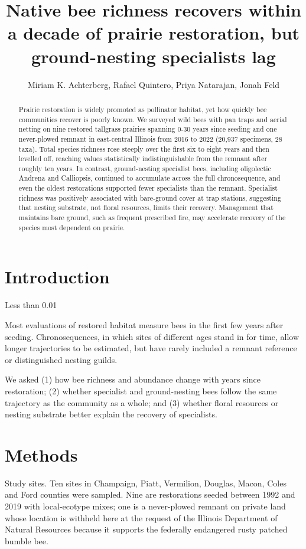 \documentclass{article}
\title{Native bee richness recovers within a decade of prairie restoration, but ground-nesting specialists lag}
\author{Miriam K. Achterberg, Rafael Quintero, Priya Natarajan, Jonah Feld}
\begin{document}
\maketitle
\begin{abstract}Prairie restoration is widely promoted as pollinator habitat, yet how quickly bee communities recover is poorly known. We surveyed wild bees with pan traps and aerial netting on nine restored tallgrass prairies spanning 0-30 years since seeding and one never-plowed remnant in east-central Illinois from 2016 to 2022 (20,937 specimens, 28 taxa). Total species richness rose steeply over the first six to eight years and then levelled off, reaching values statistically indistinguishable from the remnant after roughly ten years. In contrast, ground-nesting specialist bees, including oligolectic Andrena and Calliopsis, continued to accumulate across the full chronosequence, and even the oldest restorations supported fewer specialists than the remnant. Specialist richness was positively associated with bare-ground cover at trap stations, suggesting that nesting substrate, not floral resources, limits their recovery. Management that maintains bare ground, such as frequent prescribed fire, may accelerate recovery of the species most dependent on prairie.\end{abstract}
\section{Introduction}
Less than 0.01%

Most evaluations of restored habitat measure bees in the first few years after seeding. Chronosequences, in which sites of different ages stand in for time, allow longer trajectories to be estimated, but have rarely included a remnant reference or distinguished nesting guilds.

We asked (1) how bee richness and abundance change with years since restoration; (2) whether specialist and ground-nesting bees follow the same trajectory as the community as a whole; and (3) whether floral resources or nesting substrate better explain the recovery of specialists. \cite{winfree2009,kremen2002}
\section{Methods}
Study sites. Ten sites in Champaign, Piatt, Vermilion, Douglas, Macon, Coles and Ford counties were sampled. Nine are restorations seeded between 1992 and 2019 with local-ecotype mixes; one is a never-plowed remnant on private land whose location is withheld here at the request of the Illinois Department of Natural Resources because it supports the federally endangered rusty patched bumble bee.
\end{document}
